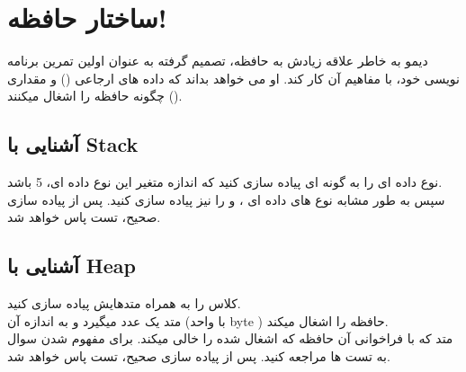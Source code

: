     \newpage
    \section{ساختار حافظه!}
    دیمو به خاطر علاقه زیادش به حافظه، تصمیم گرفته به عنوان اولین تمرین برنامه نویسی خود، با مفاهیم آن کار کند.
    او می خواهد بداند که داده های ارجاعی 
    ()
    و 
    مقداری
    ()
    چگونه حافظه را اشغال میکنند.
    
    \subsection{
        آشنایی با Stack
        \grayBox{\textcolor{purple}{C\#}}
    }
    نوع داده ای 
    \grayBox{\textcolor{blue}{Struct\_Size5}}
    را به گونه ای پیاده سازی کنید 
    که اندازه متغیر این نوع داده ای،
    5 
    باشد.
    \\
    سپس به طور مشابه 
    نوع های داده ای
    \grayBox{\textcolor{blue}{Struct\_Size10}}
    ،
    \grayBox{\textcolor{blue}{Struct\_Size12}}
    و
    \grayBox{\textcolor{blue}{Struct\_Size105}}
    را نیز پیاده سازی کنید.
    پس از پیاده سازی صحیح،
    تست
    \grayBox{\textcolor{dkgreen}{StructSize\_Tests}}
    پاس خواهد شد.
    
    \subsection{
        آشنایی با Heap
        \grayBox{\textcolor{purple}{C\#}}
    }
    کلاس
    را به همراه متدهایش
    پیاده سازی کنید.
    \\
    متد 
    \grayBox{\textcolor{blue}{Allocate}}
    یک عدد میگیرد 
    و به اندازه آن
    (با واحد 
    byte
    )
    حافظه را اشغال میکند.
    \\
    متد 
    \grayBox{\textcolor{blue}{DeAllocate}}
    که با فراخوانی آن حافظه که اشغال شده را خالی میکند.
    برای مفهوم شدن سوال به تست ها مراجعه کنید.
    پس از پیاده سازی صحیح،
    تست
    \grayBox{\textcolor{dkgreen}{HeapSize\_Tests}}
    پاس خواهد شد.
    \\
    \\
    \\
    \\
    
